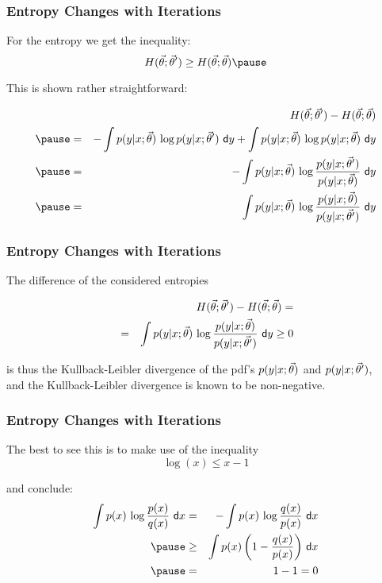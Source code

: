 \begin{frame}
  \frametitle{Entropy Changes with Iterations}
 
  For the entropy we get the inequality:
  \begin{displaymath}
    H(\p;\p') \geq H(\p; \p) \pause
  \end{displaymath}

  This is shown rather straightforward:

  \begin{eqnarray*}
    & & \hspace{-1cm}H({\p};{\p'}) - H(\p;{\p}) \\ \pause 
    &=& - \int p(y|x;\p) \, \log p(y|x;{\p}')\ \mathsf{d}y
        + \int p(y|x;\p) \, \log p(y|x;{\p})\ \mathsf{d}y \\ \pause 
    &=& - \int p(y|x;\p) \, \log \frac{p(y|x;{\p}')}{p(y|x;{\p})}\ \mathsf{d}y \\ \pause 
    &=&   \int p(y|x;\p) \, \log \frac{p(y|x;{\p})}{p(y|x;{\p'})}\ \mathsf{d}y 
  \end{eqnarray*}
\end{frame}


\begin{frame}
  \frametitle{Entropy Changes with Iterations \cont}
  
  The difference of the considered entropies

  \begin{eqnarray*}
    & & \hspace{-1cm}H({\p};{\p'})-H(\p;{\p}) = \\
    &=& \int p(y|x;{\p}) \, \log \frac{p(y|x;{\p})}{p(y|x;{\p'})}\ \mathsf{d}y \ge 0
  \end{eqnarray*}

  is thus the Kullback-Leibler divergence of the pdf's $p(y|x;{\vec{\theta}})$ and $p(y|x;{\vec{\theta}'})$, \\
  and the Kullback-Leibler divergence is known to be non-negative.
\end{frame}


\begin{frame}
  \frametitle{Entropy Changes with Iterations \cont}

  The best to see this is to make use of the inequality
  \begin{displaymath}
  \log(x) \leq x-1
  \end{displaymath}

  and conclude:
  \begin{eqnarray*}
    \int p(x) \, \log \frac{p(x)}{q(x)}\ \mathsf{d}x 
      & =  & -\int p(x) \, \log \frac{q(x)}{p(x)}\ \mathsf{d}x \\ \pause
      &\geq& \int p(x) \left( 1 - \frac{q(x)}{p(x)} \right) \, \mathsf{d}x\\ \pause 
      & =  & 1-1 = 0
  \end{eqnarray*}
\end{frame}


